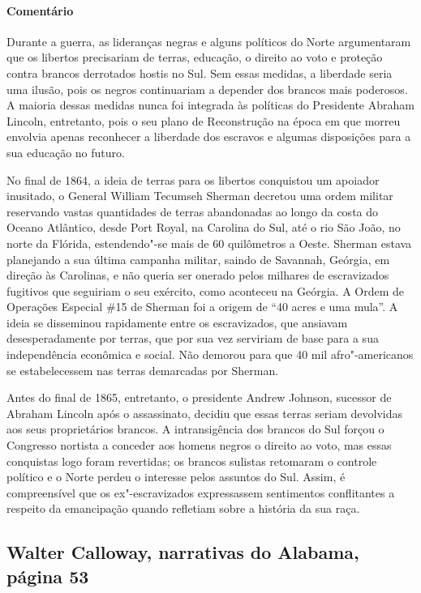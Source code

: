 \paragraph{Comentário}\quad
{\small
Durante a guerra, as lideranças negras e alguns políticos do Norte
argumentaram que os libertos precisariam de terras, educação, o
direito ao voto e proteção contra brancos derrotados hostis no Sul. Sem
essas medidas, a liberdade seria uma ilusão, pois os negros continuariam
a depender dos brancos mais poderosos. A maioria dessas medidas nunca
foi integrada às políticas do Presidente Abraham Lincoln, entretanto,
pois o seu plano de Reconstrução na época em que morreu envolvia apenas
reconhecer a liberdade dos escravos e algumas disposições para a sua
educação no futuro.

No final de 1864, a ideia de terras para os libertos conquistou um
apoiador inusitado, o General William Tecumseh Sherman decretou uma
ordem militar reservando vastas quantidades de terras abandonadas ao
longo da costa do Oceano Atlântico, desde Port Royal, na Carolina do
Sul, até o rio São João, no norte da Flórida, estendendo"-se mais de 60
quilômetros a Oeste. Sherman estava planejando a sua última campanha militar,
saindo de Savannah, Geórgia, em direção às Carolinas, e não queria ser
onerado pelos milhares de escravizados fugitivos que seguiriam o seu
exército, como aconteceu na Geórgia. A Ordem de Operações Especial \#15
de Sherman foi a origem de ``40 acres e uma mula''. A ideia se
disseminou rapidamente entre os escravizados, que ansiavam desesperadamente
por terras, que por sua vez serviriam de base para a sua independência
econômica e social. Não demorou para que 40 mil afro"-americanos se
estabelecessem nas terras demarcadas por Sherman.

Antes do final de 1865, entretanto, o presidente Andrew Johnson,
sucessor de Abraham Lincoln após o assassinato, decidiu que essas terras
seriam devolvidas aos seus proprietários brancos. A intransigência dos
brancos do Sul forçou o Congresso nortista a conceder aos homens negros
o direito ao voto, mas essas conquistas logo foram revertidas; os
brancos sulistas retomaram o controle político e o Norte perdeu o
interesse pelos assuntos do Sul. Assim, é compreensível que os
ex"-escravizados expressassem sentimentos conflitantes a respeito da
emancipação quando refletiam sobre a história da sua raça.
}

\subsection{Walter Calloway, narrativas do Alabama, página 53} \label{ref43}

